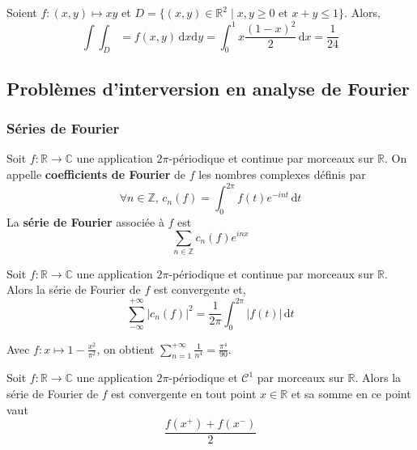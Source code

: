 
  \begin{example}
    Soient $f : (x,y) \mapsto xy$ et $D = \{ (x,y) \in \mathbb{R}^2 \mid x, y \geq 0 \text{ et } x + y \leq 1 \}$. Alors,
    \[ \int \int_D = f(x,y) \, \mathrm{d}x \mathrm{d}y = \int_0^1 x \frac{(1-x)^2}{2} \, \mathrm{d}x = \frac{1}{24} \]
  \end{example}

  \subsection{Problèmes d'interversion en analyse de Fourier}

  \subsubsection{Séries de Fourier}


  \begin{definition}
    Soit $f : \mathbb{R} \rightarrow \mathbb{C}$ une application $2\pi$-périodique et continue par morceaux sur $\mathbb{R}$. On appelle \textbf{coefficients de Fourier} de $f$ les nombres complexes définis par
    \[ \forall n \in \mathbb{Z}, \, c_n(f) = \int_{0}^{2\pi} f(t) e^{-int} \, \mathrm{d}t \]
    La \textbf{série de Fourier} associée à $f$ est
    \[ \sum_{n \in \mathbb{Z}} c_n(f)e^{inx} \]
  \end{definition}

  \begin{theorem}[Parseval]
    Soit $f : \mathbb{R} \rightarrow \mathbb{C}$ une application $2\pi$-périodique et continue par morceaux sur $\mathbb{R}$. Alors la série de Fourier de $f$ est convergente et,
    \[ \sum_{-\infty}^{+\infty} |c_n(f)|^2 = \frac{1}{2\pi} \int_0^{2\pi} |f(t)| \, \mathrm{d}t \]
  \end{theorem}

  \begin{example}
    Avec $f : x \mapsto 1 - \frac{x^2}{\pi^2}$, on obtient $\sum_{n=1}^{+\infty} \frac{1}{n^4} = \frac{\pi^4}{90}$.
  \end{example}

  \begin{theorem}
    Soit $f : \mathbb{R} \rightarrow \mathbb{C}$ une application $2\pi$-périodique et $\mathcal{C}^1$ par morceaux sur $\mathbb{R}$. Alors la série de Fourier de $f$ est convergente en tout point $x \in \mathbb{R}$ et sa somme en ce point vaut
    \[ \frac{f(x^+) + f(x^-)}{2} \]
  \end{theorem}

